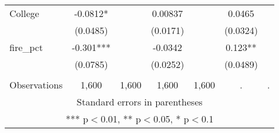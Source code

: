\begin{tabular}{lcccccc}
College & -0.0812* &  & 0.00837 &  & 0.0465 &  \\
 & (0.0485) &  & (0.0171) &  & (0.0324) &  \\
fire\_pct & -0.301*** &  & -0.0342 &  & 0.123** &  \\
 & (0.0785) &  & (0.0252) &  & (0.0489) &  \\
 &  &  &  &  &  &  \\
 Observations & 1,600 & 1,600 & 1,600 & 1,600 & . & . \\ \hline
\multicolumn{7}{c}{ Standard errors in parentheses} \\
\multicolumn{7}{c}{ *** p$<$0.01, ** p$<$0.05, * p$<$0.1} \\
\end{tabular}
